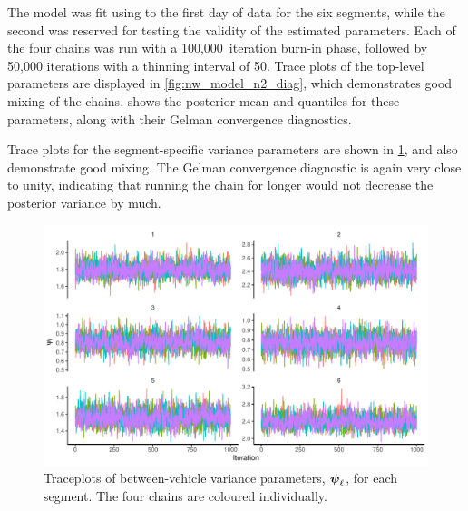 The model was fit using  to the first day of data for the six segments, while the second was reserved for testing the validity of the estimated parameters. Each of the four chains was run with a 100,000~iteration burn-in phase, followed by 50,000 iterations with a thinning interval of 50. Trace plots of the top-level parameters are displayed in \cref{fig:nw_model_n2_diag}, which demonstrates good mixing of the chains.  shows the posterior mean and quantiles for these parameters, along with their Gelman convergence diagnostics.


Trace plots for the segment-specific variance parameters are shown in \cref{fig:nw_model_n2_diag_2}, and also demonstrate good mixing. The Gelman convergence diagnostic is again very close to unity, indicating that running the chain for longer would not decrease the posterior variance by much.



\begin{knitrout}\small
{}\color{fgcolor}\begin{figure}

{\centering \includegraphics[width=\textwidth]{figure/nw_model_n2_diag_2-1} 

}

\caption[Traceplots of between-vehicle variance parameters, $\NWvar_\ell$, for each segment]{Traceplots of between-vehicle variance parameters, $\NWvar_\ell$, for each segment. The four chains are coloured individually.}\label{fig:nw_model_n2_diag_2}
\end{figure}


\end{knitrout}


